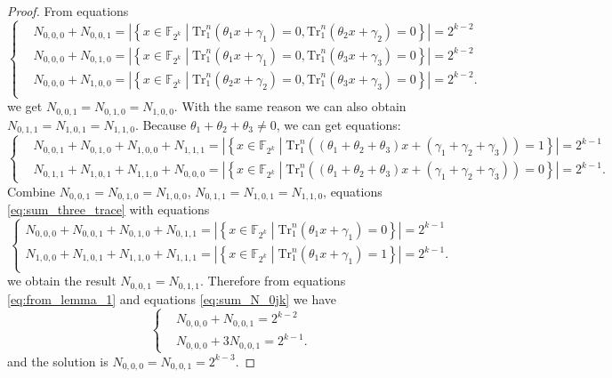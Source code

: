 \documentclass[runningheads,a4paper]{article}
\newtheorem{proof}{Proof}
\newcommand{\F}{\mathbb{F}}
\newcommand{\0}{\textbf{0}}
\newcommand{\1}{\textbf{1}}
\renewcommand{\Tr}{\mathrm{Tr}_1^n}
\begin{document}
\begin{proof}
  From equations 
  \begin{equation}\label{eq:from_lemma_1}\left\{\begin{alignedat}{3}
      &N_{0,0,0}+N_{0,0,1}=\left\lvert\left\{x\in\F_{2^k}\middle|\Tr\left(\theta_1x+\gamma_1\right)=0, \Tr\left(\theta_2x+\gamma_2\right)=0\right\}\right\rvert=2^{k-2}\\
      &N_{0,0,0}+N_{0,1,0}=\left\lvert\left\{x\in\F_{2^k}\middle|\Tr\left(\theta_1x+\gamma_1\right)=0, \Tr\left(\theta_3x+\gamma_3\right)=0\right\}\right\rvert=2^{k-2}\\
      &N_{0,0,0}+N_{1,0,0}=\left\lvert\left\{x\in\F_{2^k}\middle|\Tr\left(\theta_2x+\gamma_2\right)=0, \Tr\left(\theta_3x+\gamma_3\right)=0\right\}\right\rvert=2^{k-2}.\\
\end{alignedat}\right.\end{equation}
    we get $ N_{0,0,1}=N_{0,1,0}=N_{1,0,0} $. With the same reason we can also obtain  $ N_{0,1,1}=N_{1,0,1}=N_{1,1,0} $. 
    Because $ \theta_1+\theta_2+\theta_3\ne 0 $, we can get equations: 
   \begin{equation}\label{eq:sum_three_trace} \left\{\begin{alignedat}{2}
        &N_{0,0,1}+N_{0,1,0}+N_{1,0,0}+N_{1,1,1}=\left\lvert\left\{x\in\F_{2^k}\middle|\Tr\left(\left(\theta_1+\theta_2+\theta_3\right)x+\left(\gamma_1+\gamma_2+\gamma_3\right)\right)=1\right\}\right\rvert=2^{k-1}\\
        &N_{0,1,1}+N_{1,0,1}+N_{1,1,0}+N_{0,0,0}=\left\lvert\left\{x\in\F_{2^k}\middle|\Tr\left(\left(\theta_1+\theta_2+\theta_3\right)x+\left(\gamma_1+\gamma_2+\gamma_3\right)\right)=0\right\}\right\rvert=2^{k-1}.
     \end{alignedat}\right.\end{equation}
  Combine $ N_{0,0,1}=N_{0,1,0}=N_{1,0,0} $,  $ N_{0,1,1}=N_{1,0,1}=N_{1,1,0} $, equations \eqref{eq:sum_three_trace} with equations 
\begin{equation}\label{eq:sum_N_0jk}\left\{\begin{alignedat}{2}
    N_{0,0,0}+N_{0,0,1}+N_{0,1,0}+N_{0,1,1}=\left\lvert\left\{x\in\F_{2^k}\middle|\Tr\left(\theta_1x+\gamma_1\right)=0\right\}\right\rvert=2^{k-1}\\
    N_{1,0,0}+N_{1,0,1}+N_{1,1,0}+N_{1,1,1}=\left\lvert\left\{x\in\F_{2^k}\middle|\Tr\left(\theta_1x+\gamma_1\right)=1\right\}\right\rvert=2^{k-1}.\\
\end{alignedat}\right.\end{equation}
  we obtain the result $ N_{0,0,1}=N_{0,1,1} $. 
  Therefore from equations \eqref{eq:from_lemma_1} and equations \eqref{eq:sum_N_0jk} we have 
  \begin{equation}\left\{\begin{alignedat}{2}
          &N_{0,0,0}+N_{0,0,1}=2^{k-2}\\
          &N_{0,0,0}+3N_{0,0,1}=2^{k-1}.
  \end{alignedat}\right.\end{equation}
  and the solution is $ N_{0,0,0}=N_{0,0,1}=2^{k-3} $.
\end{proof}
  
\end{document}
